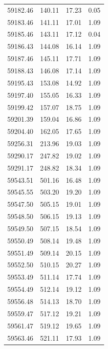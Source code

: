 \begin{longtable}{|c|c|c|c|}
 59182.46 &  140.11 &       17.23 &          0.05 \\
 59183.46 &  141.11 &       17.01 &          1.09 \\
 59185.46 &  143.11 &       17.12 &          0.04 \\
 59186.43 &  144.08 &       16.14 &          1.09 \\
 59187.46 &  145.11 &       17.71 &          1.09 \\
 59188.43 &  146.08 &       17.14 &          1.09 \\
 59195.43 &  153.08 &       14.92 &          1.09 \\
 59197.40 &  155.05 &       16.33 &          1.09 \\
 59199.42 &  157.07 &       18.75 &          1.09 \\
 59201.39 &  159.04 &       16.86 &          1.09 \\
 59204.40 &  162.05 &       17.65 &          1.09 \\
 59256.31 &  213.96 &       19.03 &          1.09 \\
 59290.17 &  247.82 &       19.02 &          1.09 \\
 59291.17 &  248.82 &       18.34 &          1.09 \\
 59543.51 &  501.16 &       16.48 &          1.09 \\
 59545.55 &  503.20 &       19.20 &          1.09 \\
 59547.50 &  505.15 &       19.01 &          1.09 \\
 59548.50 &  506.15 &       19.13 &          1.09 \\
 59549.50 &  507.15 &       18.54 &          1.09 \\
 59550.49 &  508.14 &       19.48 &          1.09 \\
 59551.49 &  509.14 &       20.15 &          1.09 \\
 59552.50 &  510.15 &       20.27 &          1.09 \\
 59553.49 &  511.14 &       17.74 &          1.09 \\
 59554.49 &  512.14 &       19.12 &          1.09 \\
 59556.48 &  514.13 &       18.70 &          1.09 \\
 59559.47 &  517.12 &       19.21 &          1.09 \\
 59561.47 &  519.12 &       19.65 &          1.09 \\
 59563.46 &  521.11 &       17.93 &          1.09 \\

\end{longtable}
